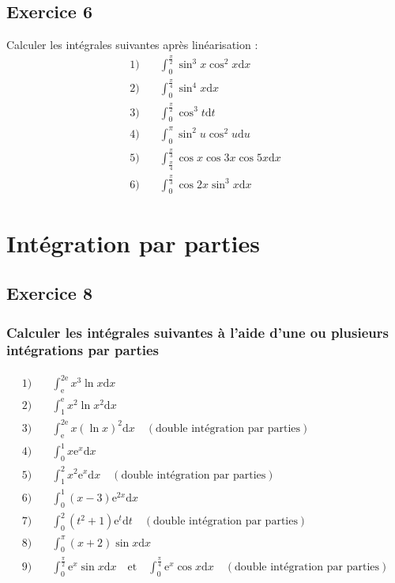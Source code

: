 \documentclass[12pt]{article}
\begin{document}
\subsection*{Exercice 6}
Calculer les intégrales suivantes après linéarisation :
\begin{align*}
1) & \quad \int_{0}^{\frac{\pi}{2}}\sin^{3}x\cos^{2}x\mathrm{d}x \\
2) & \quad \int_{0}^{\frac{\pi}{4}}\sin^{4}x\mathrm{d}x \\
3) & \quad \int_{0}^{\frac{\pi}{2}}\cos^{3}t\mathrm{d}t \\
4) & \quad \int_{0}^{\pi}\sin^{2}u\cos^{2}u\mathrm{d}u \\
5) & \quad \int_{\frac{\pi}{4}}^{\frac{\pi}{3}}\cos x\cos 3x\cos 5x\mathrm{d}x \\
6) & \quad \int_{0}^{\frac{\pi}{3}}\cos 2x\sin^{3}x\mathrm{d}x
\end{align*}
\section*{Intégration par parties}
\subsection*{Exercice 8}
\subsubsection*{Calculer les intégrales suivantes à l'aide d'une ou plusieurs intégrations par parties}
\begin{align*}
1) & \quad \int_{\mathrm{e}}^{2\mathrm{e}}x^{3}\ln x\mathrm{d}x \\
2) & \quad \int_{1}^{\mathrm{e}}x^{2}\ln x^{2}\mathrm{d}x \\
3) & \quad \int_{\mathrm{e}}^{2\mathrm{e}}x(\ln x)^{2}\mathrm{d}x \quad (\text{double intégration par parties})\\
4) & \quad \int_{0}^{1}x\mathrm{e}^{x}\mathrm{d}x \\
5) & \quad \int_{1}^{2}x^{2}\mathrm{e}^{x}\mathrm{d}x \quad (\text{double intégration par parties})\\
6) & \quad \int_{0}^{1}(x-3)\mathrm{e}^{2x}\mathrm{d}x \\
7) & \quad \int_{0}^{2}(t^{2}+1)\mathrm{e}^{t}\mathrm{d}t \quad (\text{double intégration par parties})\\
8) & \quad \int_{0}^{\pi}(x+2)\sin x\mathrm{d}x \\
9) & \quad \int_{0}^{\frac{\pi}{2}}\mathrm{e}^{x}\sin x\mathrm{d}x \quad \text{et} \quad \int_{0}^{\frac{\pi}{4}}\mathrm{e}^{x}\cos x\mathrm{d}x \quad (\text{double intégration par parties})\\
\end{align*}
\end{document}
